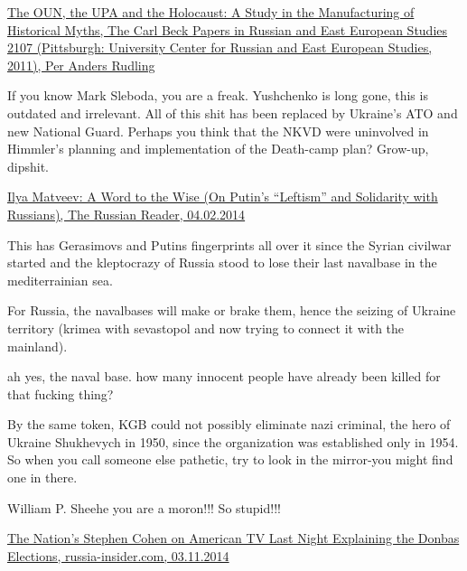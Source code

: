 \begin{itemize}
\begin{itemize}
\href{https://www.academia.edu/1122859/The_OUN_the_UPA_and_the_Holocaust_A_Study_in_the_Manufacturing_of_Historical_Myths_The_Carl_Beck_Papers_in_Russian_and_East_European_Studies_2107_Pittsburgh_University_Center_for_Russian_and_East_European_Studies_2011_}{%
The OUN, the UPA and the Holocaust: A Study in the Manufacturing of Historical Myths, The Carl Beck Papers in Russian and East European Studies 2107 (Pittsburgh: University Center for Russian and East European Studies, 2011), Per Anders Rudling%
}


If you know Mark Sleboda, you are a freak. Yushchenko is long gone, this is
outdated and irrelevant. All of this shit has been replaced by Ukraine's ATO
and new National Guard. Perhaps you think that the NKVD were uninvolved in
Himmler's planning and implementation of the Death-camp plan? Grow-up, dipshit.

\href{https://therussianreader.com/2014/02/04/matveev-putin-leftism}{%
Ilya Matveev: A Word to the Wise (On Putin’s \enquote{Leftism} and Solidarity with Russians), %
The Russian Reader, 04.02.2014%
}


This has Gerasimovs and Putins fingerprints all over it since the Syrian
civilwar started and the kleptocrazy of Russia stood to lose their last
navalbase in the mediterrainian sea.

For Russia, the navalbases will make or brake them, hence the seizing of
Ukraine territory (krimea with sevastopol and now trying to connect it with the
mainland).


ah yes, the naval base. how many innocent people have already been killed for
that fucking thing?


By the same token, KGB could not possibly eliminate nazi criminal, the hero of
Ukraine Shukhevych in 1950, since the organization was established only in
1954. So when you call someone else pathetic, try to look in the mirror-you
might find one in there.

William P. Sheehe you are a moron!!! So stupid!!!


\href{https://russia-insider.com/en/tv_politics_ukraine/2014/11/07/01-12-12pm/nations_stephen_cohen_american_tv_last_night_explaining}{%
The Nation's Stephen Cohen on American TV Last Night Explaining the Donbas Elections, russia-insider.com, 03.11.2014%
}


\end{itemize}
\end{itemize}
